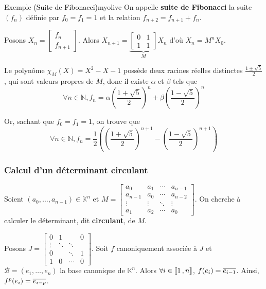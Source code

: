     \begin{omed}{Exemple \textcolor{black}{(Suite de Fibonacci)}}{myolive}
        On appelle \textbf{suite de Fibonacci} la suite $(f_n)$ définie par $f_0 = f_1 = 1$ et la relation $f_{n+2} = f_{n+1} + f_n$. 

        Posons $X_n = \begin{bmatrix}
            f_n \\
            f_{n+1}
        \end{bmatrix}$. Alors $X_{n+1} = \underbrace{\begin{bmatrix}
            0 & 1 \\
            1 & 1
        \end{bmatrix}}_M X_n$ d’où $X_n = M^n X_0$.

        Le polynôme $\chi_M(X) = X^2 - X - 1$ possède deux racines réelles distinctes $\frac{1 \pm \sqrt{5}}{2}$, qui sont valeurs propres de $M$, donc il existe $\alpha$ et $\beta$ tels que 
        \[ \forall n \in \mathbb{N}, f_n = \alpha \left( \frac{1 + \sqrt{5}}{2} \right)^n + \beta \left( \frac{1-\sqrt{5}}{2} \right)^n \]
        
        Or, sachant que $f_0 = f_1 = 1$, on trouve que 
        \[ \forall n \in \mathbb{N}, f_n = \frac{1}{2} \left( \left( \frac{1 + \sqrt{5}}{2} \right)^{n+1} - \left( \frac{1-\sqrt{5}}{2} \right)^{n+1}  \right) \]
    \end{omed}

    \subsubsection{Calcul d’un déterminant circulant}

    Soient $(a_0, \ldots, a_{n-1}) \in \mathbb{K}^n$ et $M = \begin{bmatrix}
        a_0 & a_1 & \cdots & a_{n-1} \\
        a_{n-1} & a_0 & \cdots & a_{n-2} \\
        \vdots & \vdots & \ddots & \vdots \\
        a_1 & a_2 & \cdots & a_0
    \end{bmatrix}$. On cherche à calculer le déterminant, dit \textbf{circulant}, de $M$.

    Posons $J = \begin{bmatrix}
        0 & 1 & & 0 \\
        \vdots & \ddots & \ddots & \\
        0 & & \ddots & 1 \\
        1 & 0 & \cdots & 0
    \end{bmatrix}$. Soit $f$ canoniquement associée à $J$ et $\mathcal{B} = (e_1,\ldots, e_n)$ la base canonique de $\mathbb{K}^n$. Alors $\forall i \in \left\llbracket 1 \, , n \right\rrbracket$, $f(e_i) = \overline{e_{i-1}}$. Ainsi, $f^p(e_i) = \overline{e_{i - p}}$. 


